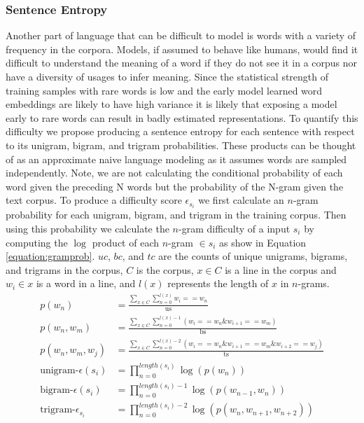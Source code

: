 \subsubsection{Sentence Entropy}
Another part of language that can be difficult to model is words with a variety of frequency in the corpora. Models, if assumed to behave like humans, would find it difficult to understand the meaning of a word if they do not see it in a corpus nor have a diversity of usages to infer meaning. Since the statistical strength of training samples with rare words is low and the early model learned word embeddings are likely to have high variance it is likely that exposing a model early to rare words can result in badly estimated representations. To quantify this difficulty we propose producing a sentence entropy for each sentence with respect to its unigram, bigram, and trigram probabilities. These products can be thought of as an approximate naive language modeling as it assumes words are sampled independently. Note, we are not calculating the conditional probability of each word given the preceding N words but the probability of the N-gram given the text corpus. To produce a difficulty score $\epsilon_{s_i}$ we first calculate an $n$-gram probability for each unigram, bigram, and trigram in the training corpus. Then using this probability we calculate the $n$-gram difficulty of a input $s_i$  by computing the $\log$ product of each $n$-gram $\in s_i$ as show in Equation \ref{equation:gramprob}. $uc$, $bc$, and $tc$ are the counts of unique unigrams, bigrams, and trigrams in the corpus, $C$ is the corpus, $x \in C$ is a line in the corpus and $w_i \in x$ is a word in a line, and $l(x)$ represents the length of $x$ in $n$-grams.
\begin{equation}
\begin{split}
    p(w_n) &= \frac{\sum_{x \in C} \sum_{n=0}^{l(x)} w_i == w_{n}}{\text{us}} \\
    p(w_{n}, w_{m})  & = \frac{\sum_{x \in C} \sum_{n=0}^{l(x)-1}(w_i == w_{n} \& w_{i+1} == w_m)}{\text{bs}} \\
    p(w_{n}, w_{m}, w_{j})  & = \frac{\sum_{x \in C}\sum_{n=0}^{l(x)-2} (w_i == w_{n} \& w_{i+1} == w_m\& w_{i+2} == w_j) }{\text{ts}} \\
    \text{unigram-} \epsilon({s_i}) &= \prod_{n=0}^{length(s_i)} \log(p(w_n)) \\
       \text{bigram-} \epsilon({s_i}) &= \prod_{n=0}^{length(s_i)-1} \log(p(w_{n-1}, w_n)) \\
       \text{trigram-} \epsilon_{s_i} &= \prod_{n=0}^{length(s_i)-2} \log(p(w_{n}, w_{n+1}, w_{n+2})) 
\end{split}
\label{equation:gramprob}
\end{equation}
